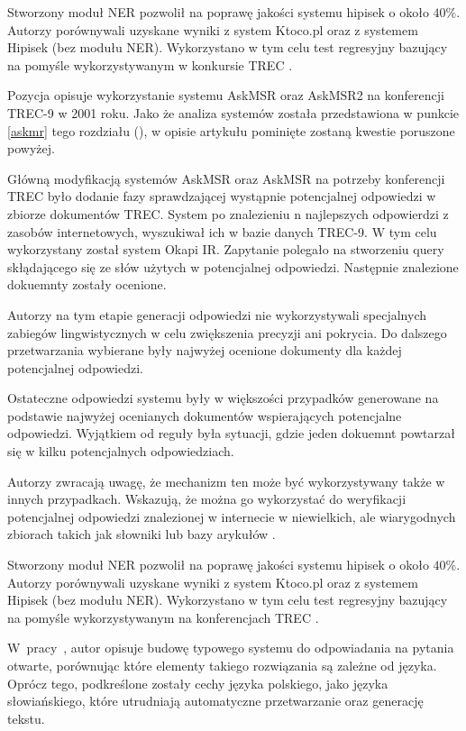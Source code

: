 Stworzony moduł NER pozwolił na poprawę jakości systemu hipisek o około $40$\%. Autorzy porównywali uzyskane wyniki z system Ktoco.pl oraz z systemem Hipisek (bez modułu NER). Wykorzystano w tym celu test regresyjny bazujący na pomyśle wykorzystywanym w konkursie TREC \cite{polishQAS}.

Pozycja \cite{brill2001data} opisuje wykorzystanie systemu AskMSR oraz AskMSR2 na konferencji TREC-9 w 2001 roku. Jako że analiza systemów została przedstawiona w punkcie \ref{askmr} tego rozdziału (\cite{brill2002analysis}), w opisie artykułu pominięte zostaną kwestie poruszone powyżej.

Główną modyfikacją systemów AskMSR oraz AskMSR na potrzeby konferencji TREC było dodanie fazy sprawdzającej wystąpnie potencjalnej odpowiedzi w zbiorze dokumentów TREC. System po znalezieniu n najlepszych odpowierdzi z zasobów internetowych, wyszukiwał ich w bazie danych TREC-9. W tym celu wykorzystany został system Okapi IR. Zapytanie polegało na stworzeniu query skłądającego się ze słów użytych w potencjalnej odpowiedzi. Następnie znalezione dokuemnty zostały ocenione.

Autorzy \cite{brill2001data} na tym etapie generacji odpowiedzi nie wykorzystywali specjalnych zabiegów lingwistycznych w celu zwiększenia precyzji ani pokrycia. Do dalszego przetwarzania wybierane były najwyżej ocenione dokumenty dla każdej potencjalnej odpowiedzi.

Ostateczne odpowiedzi systemu były w większości przypadków generowane na podstawie najwyżej ocenianych dokumentów wspierających potencjalne odpowiedzi. Wyjątkiem od reguły była sytuacji, gdzie jeden dokuemnt powtarzał się w kilku potencjalnych odpowiedziach.

Autorzy \cite{brill2001data} zwracają uwagę, że mechanizm ten może być wykorzystywany także w innych przypadkach. Wskazują, że można go wykorzystać do weryfikacji potencjalnej odpowiedzi znalezionej w internecie w niewielkich, ale wiarygodnych zbiorach takich jak słowniki lub bazy arykułów \cite{brill2001data}.

Stworzony moduł NER pozwolił na poprawę jakości systemu hipisek o około $40$\%. Autorzy porównywali uzyskane wyniki z system Ktoco.pl oraz z systemem Hipisek (bez modułu NER). Wykorzystano w tym celu test regresyjny bazujący na pomyśle wykorzystywanym na konferencjach TREC \cite{brill2001data}.

W~pracy~\cite{przybyla2012issues}, autor opisuje budowę typowego systemu do odpowiadania na pytania otwarte, porównując które elementy takiego rozwiązania są zależne od języka. Oprócz tego, podkreślone zostały cechy języka polskiego, jako języka słowiańskiego, które utrudniają automatyczne przetwarzanie oraz generację tekstu.

